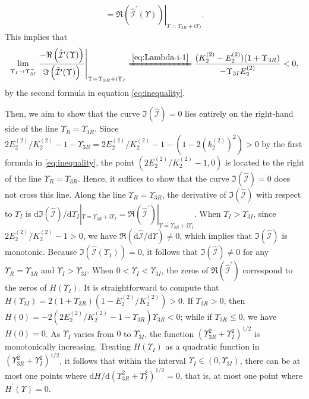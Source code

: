 \documentclass[11pt,reqno]{amsart}
\newcommand{\ii}{\mathrm{i}}
\newcommand{\dd}{\mathrm{d}}
\numberwithin{equation}{section}
\begin{document}
\begin{proof-spec-cn}
\begin{equation}
\begin{split}
			=	\left.\Re\left(\hat{\mathcal{I}}^{\prime}(\Upsilon)\right)\right|_{\Upsilon=\Upsilon_{3R}+\ii \Upsilon_I}.
		\end{split}
	\end{equation}	
	This implies that 
	\begin{equation}\nonumber
		\lim\limits_{\Upsilon_I\rightarrow \Upsilon_{3I}^{-}}\left.\frac{-\Re\left( \hat{\mathcal{I}}^{\prime} (\Upsilon)\right)}{\Im\left( \hat{\mathcal{I}}^{\prime} (\Upsilon)\right)}\right|_{\Upsilon=\Upsilon_{3R}+\ii \Upsilon_I}
		\xlongequal{\eqref{eq:Lambda-i-1}}\frac{(K^{(2)}_2-E^{(2)}_2)(1+\Upsilon_{3R})}{-\Upsilon_{3I} E^{(2)}_2}<0,
	\end{equation}
	by the second formula in equation \eqref{eq:inequality}.
	
	Then, we aim to show that the curve $\Im(\hat{\mathcal{I}})=0$ lies entirely on the right-hand side of the line $\Upsilon_R=\Upsilon_{3R}$.
	Since $2E^{(2)}_2/K^{(2)}_2-1-\Upsilon_{3R}=2E^{(2)}_2/K^{(2)}_2-1-(1-2(k^{(2)}_2)^2)>0$ by the first formula in \eqref{eq:inequality}, the point $(2E^{(2)}_2/K^{(2)}_2-1,0)$ is located to the right of the line $\Upsilon_R=\Upsilon_{3R}$. Hence, it suffices to show that the curve $\Im(\hat{\mathcal{I}})=0$ does not cross this line.
	Along the line $\Upsilon_R=\Upsilon_{3R}$,
	the derivative of $\Im(\hat{\mathcal{I}})$ with respect to $\Upsilon_I$ is 
	$\dd  {\Im}( \hat{\mathcal{I}})/\dd \Upsilon_I|_{\Upsilon=\Upsilon_{3R}+\ii \Upsilon_I}
	\!
	={\Re}\left( \hat{\mathcal{I}}^{\prime}\right)|_{\Upsilon=\Upsilon_{3R}+\ii \Upsilon_I}$.
	When $\Upsilon_I>\Upsilon_{3I}$, since $2E^{(2)}_2/K^{(2)}_2-1>0$, we have $\Re(\dd \hat{\mathcal{I}}/\dd \Upsilon) \neq 0$, which implies that $\Im(\hat{\mathcal{I}})$ is monotonic. 
	Because $\Im(\hat{\mathcal{I}}(\Upsilon_{1}))=0$, it follows that $\Im(\hat{\mathcal{I}})\neq 0$ for any $\Upsilon_R=\Upsilon_{3R}$ and $\Upsilon_I>\Upsilon_{3I}$.
	When $0<\Upsilon_I<\Upsilon_{3I}$, the zeros of $\Re( \hat{\mathcal{I}}^{\prime})$ correspond to the zeros of $H(\Upsilon_I)$.
	It is straightforward to compute that 
	$H(\Upsilon_{3I})=2(1+\Upsilon_{3R})(1-E^{(2)}_2/K^{(2)}_2)>0$. 
	If $\Upsilon_{3R}>0$, then $H(0)=-2(2 E^{(2)}_2/K^{(2)}_2-1-\Upsilon_{3R})\Upsilon_{3R}<0$; while if $\Upsilon_{3R}\le 0$, we have $H(0)=0$. 
	As $\Upsilon_I$ varies from $0$ to $\Upsilon_{3I}$, the function $(\Upsilon_{3R}^2+\Upsilon_I^2)^{1/2}$ is monotonically increasing.
	Treating $H(\Upsilon_I) $ as a quadratic function in $(\Upsilon_{3R}^2+\Upsilon_I^2 )^{1/2}$, it follows that within the interval $\Upsilon_I\in (0,\Upsilon_{3I})$, there can be at most one points where $\dd H/\dd (\Upsilon_{3R}^2+\Upsilon_I^2)^{1/2}=0$, that is,  at most one point where $H^{\prime}(\Upsilon)=0$.

\end{proof-spec-cn}
\end{document}
